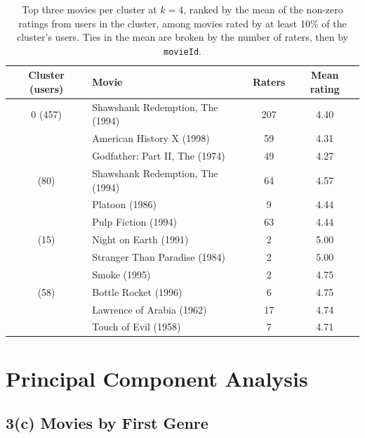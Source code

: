\documentclass[11pt]{article}
\begin{document}
\begin{table}[H]
    \centering
    \begin{tabular}{clcc}
        \toprule
        Cluster (users) & Movie                          & Raters & Mean rating \\
        \midrule
        0 (457)         & Shawshank Redemption, The (1994) & 207  & 4.40        \\
        & American History X (1998)      & 59     & 4.31        \\
        & Godfather: Part II, The (1974) & 49     & 4.27        \\
        \addlinespace
        1 (80)          & Shawshank Redemption, The (1994) & 64   & 4.57        \\
        & Platoon (1986)                 & 9      & 4.44        \\
        & Pulp Fiction (1994)            & 63     & 4.44        \\
        \addlinespace
        2 (15)          & Night on Earth (1991)          & 2      & 5.00        \\
        & Stranger Than Paradise (1984)  & 2      & 5.00        \\
        & Smoke (1995)                   & 2      & 4.75        \\
        \addlinespace
        3 (58)          & Bottle Rocket (1996)           & 6      & 4.75        \\
        & Lawrence of Arabia (1962)      & 17     & 4.74        \\
        & Touch of Evil (1958)           & 7      & 4.71        \\
        \bottomrule
    \end{tabular}
    \caption{Top three movies per cluster at $k = 4$, ranked by the mean of the non-zero ratings from users in the cluster, among movies rated by at least 10\% of the cluster's users. Ties in the mean are broken by the number of raters, then by \texttt{movieId}.}
    \label{tab:cluster_top}
\end{table}


\section{Principal Component Analysis}
\label{sec:s3}

\subsection*{3(c) Movies by First Genre}
\end{document}
